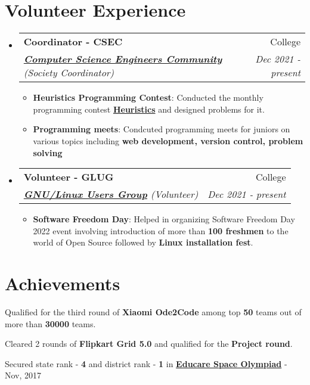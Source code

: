 \documentclass[a4paper,20pt]{article}
\makeatletter
\newcommand{\resumeItem}[2]{
  \item\small{
    \textbf{#1}{: #2 \vspace{-2pt}}
  }
}
\newcommand{\resumeSubheading}[4]{
  \vspace{-1pt}\item
    \begin{tabular*}{0.97\textwidth}{l@{\extracolsep{\fill}}r}
      \textbf{#1} & #2 \\
      \textit{#3} & \textit{#4} \\
    \end{tabular*}\vspace{-5pt}
}
\newcommand{\resumeSubHeadingListStart}{\begin{itemize}[leftmargin=*]}
\newcommand{\resumeSubHeadingListEnd}{\end{itemize}}
\newcommand{\resumeItemListStart}{\begin{itemize}}
\newcommand{\resumeItemListEnd}{\end{itemize}\vspace{-5pt}}
\makeatother
\begin{document}
  \section{Volunteer Experience}
    \resumeSubHeadingListStart
      \resumeSubheading{Coordinator - CSEC}{College}
      {{\color{blue}\href{https://github.com/CSEC-NITH}{\textbf{Computer Science Engineers Community}}} (Society Coordinator)}{Dec 2021 - present}
      \resumeItemListStart
          \resumeItem{Heuristics Programming Contest}
            {Conducted the monthly programming contest {\color{blue}\href{https://codeforces.com/group/Mka6Tznt4j/blog}{\textbf{Heuristics}}} and designed problems for it.}
            \resumeItem{Programming meets}{Condcuted programming meets for juniors on various topics including \textbf{web development, version control, problem solving}}
        \resumeItemListEnd
  
        \resumeSubheading{Volunteer - GLUG}{College}
      {{\color{blue}\href{https://github.com/glugnith}{\textbf{GNU/Linux Users Group}}} (Volunteer)}{Dec 2021 - present}
      \resumeItemListStart
            \resumeItem{Software Freedom Day}
            {Helped in organizing Software Freedom Day 2022 event involving introduction of
            more than \textbf{100 freshmen} to the world of Open Source followed by \textbf{Linux
            installation fest}.}
        \resumeItemListEnd
  
  \resumeSubHeadingListEnd


\vspace{1pt}
\section{Achievements}
\begin{description}[font=$\bullet$]
  \item {Qualified for the third round of \textbf{Xiaomi Ode2Code} among top \textbf{50} teams out of more than \textbf{30000} teams.}
\vspace{-5pt}
\item {Cleared 2 rounds of \textbf{Flipkart Grid 5.0} and qualified for the \textbf{Project round}.}
\vspace{-5pt}
\item {Secured state rank - \textbf{4} and district rank - \textbf{1} in {\color{blue}\href{https://www.linkedin.com/posts/prathmesh-chhabra-51760719b_educare-activity-6758391883443138560-phJb/}{\textbf{Educare Space Olympiad}}} - Nov, 2017}


\end{description}
\end{document}
